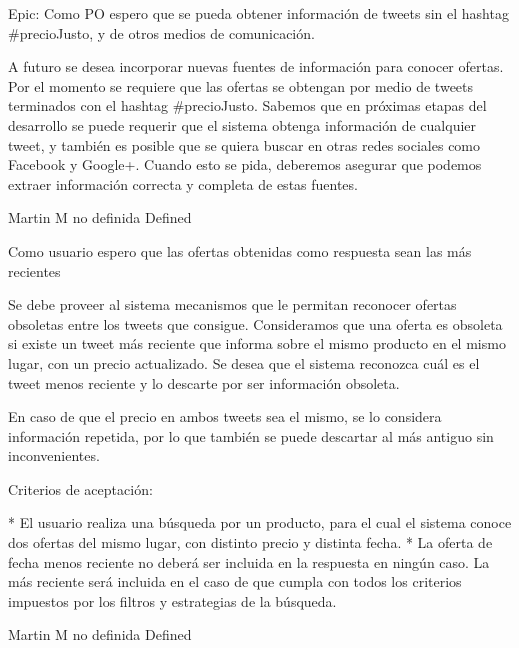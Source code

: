 	{Epic: Como PO espero que se pueda obtener información de tweets sin el hashtag #precioJusto, y de otros medios de comunicación.} %
	{A futuro se desea incorporar nuevas fuentes de información para conocer
ofertas. Por el momento se requiere que las ofertas se obtengan por medio de
tweets terminados con el hashtag #precioJusto. Sabemos que en próximas etapas
del desarrollo se puede requerir que el sistema obtenga información de
cualquier tweet, y también es posible que se quiera buscar en otras redes
sociales como Facebook y Google+. Cuando esto se pida, deberemos asegurar que
podemos extraer información correcta y completa de estas fuentes.

} %
	{} %
	{} %
	{Martin M} %
	{no definida} %
	{Defined} %


\vspace{20pt}

	{Como usuario espero que las ofertas obtenidas como respuesta sean las más recientes} %
	{Se debe proveer al sistema mecanismos que le permitan reconocer ofertas
obsoletas entre los tweets que consigue. Consideramos que una oferta es
obsoleta si existe un tweet más reciente que informa sobre el mismo producto
en el mismo lugar, con un precio actualizado. Se desea que el sistema
reconozca cuál es el tweet menos reciente y lo descarte por ser información
obsoleta.

En caso de que el precio en ambos tweets sea el mismo, se lo considera
información repetida, por lo que también se puede descartar al más antiguo sin
inconvenientes.

  
Criterios de aceptación:

* El usuario realiza una búsqueda por un producto, para el cual el sistema conoce dos ofertas del mismo lugar, con distinto precio y distinta fecha.  
* La oferta de fecha menos reciente no deberá ser incluida en la respuesta en ningún caso. La más reciente será incluida en el caso de que cumpla con todos los criterios impuestos por los filtros y estrategias de la búsqueda.

} %
	{} %
	{} %
	{Martin M} %
	{no definida} %
	{Defined} %


\vspace{20pt}

